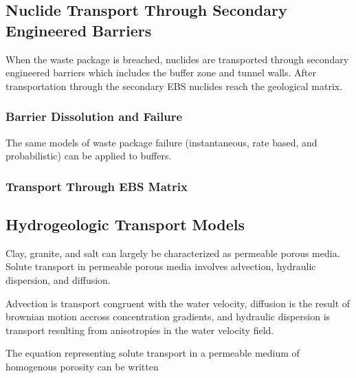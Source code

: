\subsection{Nuclide Transport Through Secondary Engineered Barriers}

When the waste package is breached, nuclides are transported through secondary 
engineered barriers which includes the buffer zone and tunnel walls. After 
transportation through the secondary EBS nuclides reach the geological matrix. 

\subsubsection{Barrier Dissolution and Failure}

The same models of waste package failure (instantaneous, rate based, and 
probabilistic) can be applied to buffers.

\subsubsection{Transport Through EBS Matrix}



\subsection{Hydrogeologic Transport Models}
Clay, granite, and salt can largely be characterized as permeable porous media. 
Solute transport in permeable porous media involves advection, hydraulic 
dispersion, and diffusion. 

Advection is transport congruent with the water velocity, diffusion is the 
result of brownian motion accross concentration gradients, and hydraulic 
dispersion is transport resulting from anisotropies in the water velocity field. 









The equation representing solute transport in a permeable medium of homogenous
porosity can be written

